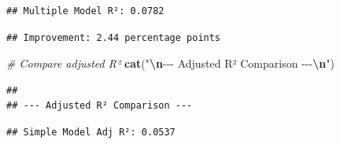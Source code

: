 \documentclass[
  12pt,
]{article}
\newenvironment{Shaded}{\begin{snugshade}}{\end{snugshade}}
\newcommand{\CommentTok}[1]{\textcolor[rgb]{0.56,0.35,0.01}{\textit{#1}}}
\newcommand{\DecValTok}[1]{\textcolor[rgb]{0.00,0.00,0.81}{#1}}
\newcommand{\FunctionTok}[1]{\textcolor[rgb]{0.13,0.29,0.53}{\textbf{#1}}}
\newcommand{\NormalTok}[1]{#1}
\newcommand{\SpecialCharTok}[1]{\textcolor[rgb]{0.81,0.36,0.00}{\textbf{#1}}}
\newcommand{\StringTok}[1]{\textcolor[rgb]{0.31,0.60,0.02}{#1}}
\begin{document}
\begin{verbatim}
## Multiple Model R²: 0.0782
\end{verbatim}

\begin{Shaded}
\end{Shaded}

\begin{verbatim}
## Improvement: 2.44 percentage points
\end{verbatim}

\begin{Shaded}
\begin{Highlighting}[]
\CommentTok{\# Compare adjusted R²}
\FunctionTok{cat}\NormalTok{(}\StringTok{"}\SpecialCharTok{\textbackslash{}n}\StringTok{{-}{-}{-} Adjusted R² Comparison {-}{-}{-}}\SpecialCharTok{\textbackslash{}n}\StringTok{"}\NormalTok{)}
\end{Highlighting}
\end{Shaded}

\begin{verbatim}
## 
## --- Adjusted R² Comparison ---
\end{verbatim}

\begin{Shaded}
\end{Shaded}

\begin{verbatim}
## Simple Model Adj R²: 0.0537
\end{verbatim}

\begin{Shaded}
\end{Shaded}
\end{document}
